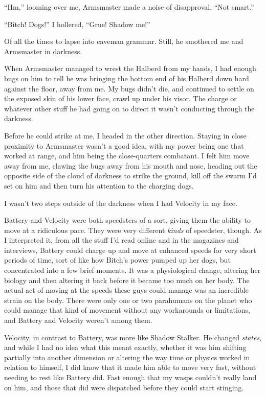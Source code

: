 ``Hm,'' looming over me, Armsmaster made a noise of disapproval, ``Not smart.''



``Bitch!  Dogs!'' I hollered, ``Grue!  Shadow me!''



Of all the times to lapse into caveman grammar.  Still, he smothered me and Armsmaster in darkness.



When Armsmaster managed to wrest the Halberd from my hands, I had enough bugs on him to tell he was bringing the bottom end of his Halberd down hard against the floor, away from me.  My bugs didn't die, and continued to settle on the exposed skin of his lower face, crawl up under his visor.  The charge or whatever other stuff he had going on to direct it wasn't conducting through the darkness.



Before he could strike at me, I headed in the other direction.  Staying in close proximity to Armsmaster wasn't a good idea, with my power being one that worked at range, and him being the close-quarters combatant.  I felt him move away from me, clawing the bugs away from his mouth and nose, heading out the opposite side of the cloud of darkness to strike the ground, kill off the swarm I'd set on him and then turn his attention to the charging dogs.



I wasn't two steps outside of the darkness when I had Velocity in my face.



Battery and Velocity were both speedsters of a sort, giving them the ability to move at a ridiculous pace.  They were very different \emph{kinds} of speedster, though.  As I interpreted it, from all the stuff I'd read online and in the magazines and interviews, Battery could charge up and move at enhanced speeds for very short periods of time, sort of like how Bitch's power pumped up her dogs, but concentrated into a few brief moments.  It was a physiological change, altering her biology and then altering it back before it became too much on her body.  The actual act of moving at the speeds these guys could manage was an incredible strain on the body.  There were only one or two parahumans on the planet who could manage that kind of movement without any workarounds or limitations, and Battery and Velocity weren't among them.



Velocity, in contrast to Battery, was more like Shadow Stalker.  He changed \emph{states}, and while I had no idea what this meant exactly, whether it was him shifting partially into another dimension or altering the way time or physics worked in relation to himself, I did know that it made him able to move very fast, without needing to rest like Battery did.  Fast enough that my wasps couldn't really land on him, and those that did were dispatched before they could start stinging.



